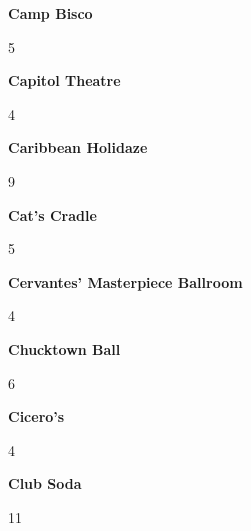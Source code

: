 \begin{center}\textbf{Camp Bisco}\end{center}
\begin{center}5\end{center} 
\newline 
\begin{center}\textbf{Capitol Theatre}\end{center}
\begin{center}4\end{center} 
\newline 
\begin{center}\textbf{Caribbean Holidaze}\end{center}
\begin{center}9\end{center} 
\newline 
\begin{center}\textbf{Cat's Cradle}\end{center}
\begin{center}5\end{center} 
\newline 
\begin{center}\textbf{Cervantes' Masterpiece Ballroom}\end{center}
\begin{center}4\end{center} 
\newline 
\begin{center}\textbf{Chucktown Ball}\end{center}
\begin{center}6\end{center} 
\newline 
\begin{center}\textbf{Cicero's}\end{center}
\begin{center}4\end{center} 
\newline 
\begin{center}\textbf{Club Soda}\end{center}
\begin{center}11\end{center} 
